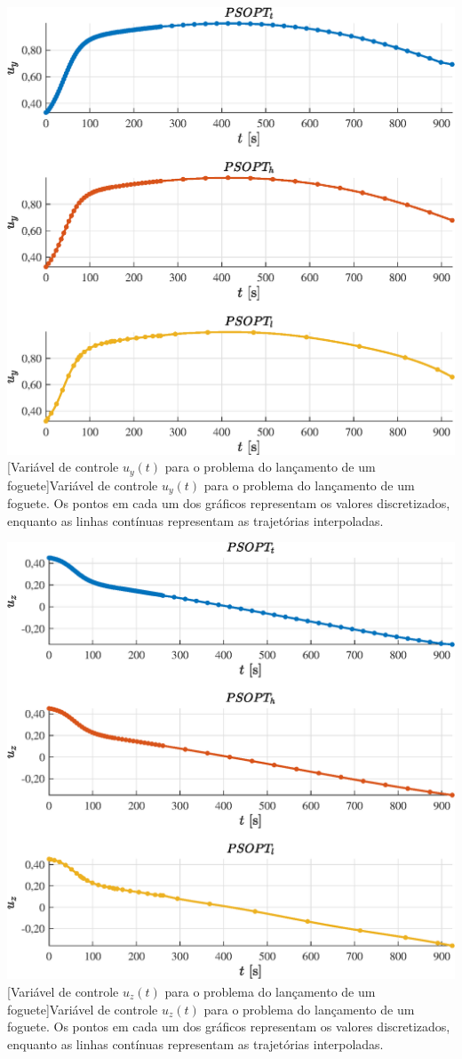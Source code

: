 \noindent
\begin{minipage}{\textwidth}
	\vspace{\onelineskip}
	\centering
	\includegraphics[width=0.7\linewidth]{fig/resultados/foguete/traj/u/u2}
	[Variável de controle $u_y(t)$ para o problema do lançamento de um foguete]{Variável de controle $u_y(t)$ para o problema do lançamento de um foguete. Os pontos em cada um dos gráficos representam os valores discretizados, enquanto as linhas contínuas representam as trajetórias interpoladas.}
	\label{fig:foguete:u:u_y}
	\vspace{\onelineskip}
\end{minipage}

\noindent
\begin{minipage}{\textwidth}
	\vspace{\onelineskip}
	\centering
	\includegraphics[width=0.7\linewidth]{fig/resultados/foguete/traj/u/u3}
	[Variável de controle $u_z(t)$ para o problema do lançamento de um foguete]{Variável de controle $u_z(t)$ para o problema do lançamento de um foguete. Os pontos em cada um dos gráficos representam os valores discretizados, enquanto as linhas contínuas representam as trajetórias interpoladas.}
	\label{fig:foguete:u:u_z}
	\vspace{\onelineskip}
\end{minipage}

